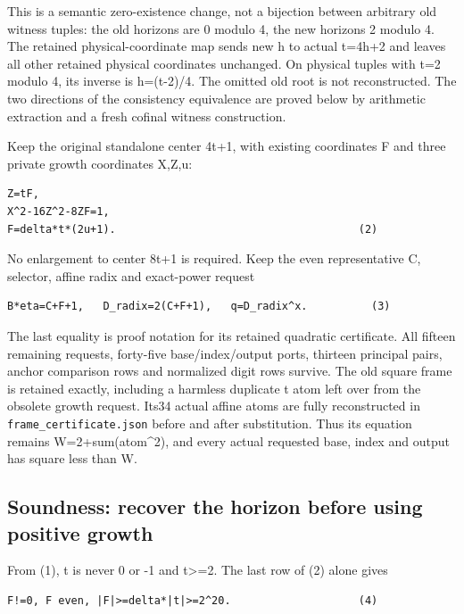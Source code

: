 This is a semantic zero-existence change, not a bijection between
arbitrary old witness tuples: the old horizons are 0 modulo 4, the new
horizons 2 modulo 4. The retained physical-coordinate map sends new h to
actual t=4h+2 and leaves all other retained physical coordinates
unchanged. On physical tuples with t=2 modulo 4, its inverse is
h=(t-2)/4. The omitted old root is not reconstructed. The two directions
of the consistency equivalence are proved below by arithmetic extraction
and a fresh cofinal witness construction.

Keep the original standalone center 4t+1, with existing coordinates F
and three private growth coordinates X,Z,u:

\begin{verbatim}
Z=tF,
X^2-16Z^2-8ZF=1,
F=delta*t*(2u+1).                                      (2)
\end{verbatim}

No enlargement to center 8t+1 is required. Keep the even representative
C, selector, affine radix and exact-power request

\begin{verbatim}
B*eta=C+F+1,   D_radix=2(C+F+1),   q=D_radix^x.          (3)
\end{verbatim}

The last equality is proof notation for its retained quadratic
certificate. All fifteen remaining requests, forty-five
base/index/output ports, thirteen principal pairs, anchor comparison
rows and normalized digit rows survive. The old square frame is retained
exactly, including a harmless duplicate t atom left over from the
obsolete growth request. Its34 actual affine atoms are fully
reconstructed in \nolinkurl{frame_certificate.json} before and after
substitution. Thus its equation remains W=2+sum(atom\^{}2), and every
actual requested base, index and output has square less than W.

\subsection{Soundness: recover the horizon before using positive
growth}\label{soundness-recover-the-horizon-before-using-positive-growth}

From (1), t is never 0 or -1 and \textbar t\textbar\textgreater=2. The
last row of (2) alone gives

\begin{verbatim}
F!=0, F even, |F|>=delta*|t|>=2^20.                    (4)
\end{verbatim}


